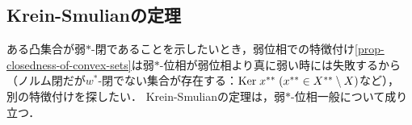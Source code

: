 \documentclass[uplatex,dvipdfmx]{jsreport}
\begin{document}
\subsection{Krein-Smulianの定理}

\begin{tcolorbox}[colframe=ForestGreen, colback=ForestGreen!10!white,breakable,colbacktitle=ForestGreen!40!white,coltitle=black,fonttitle=\bfseries\sffamily,
title=$w^*$-閉性の特徴付けは，単位閉球の言葉によってなされる．]
    ある凸集合が弱$*$-閉であることを示したいとき，弱位相での特徴付け\ref{prop-closedness-of-convex-sets}は弱$*$-位相が弱位相より真に弱い時には失敗するから（ノルム閉だが$w^*$-閉でない集合が存在する：$\mathrm{Ker}\; x^{**}\;(x^{**}\in X^{**}\setminus X)$など），
    別の特徴付けを探したい．
    Krein-Smulianの定理は，弱$*$-位相一般について成り立つ．
\end{tcolorbox}
\end{document}
